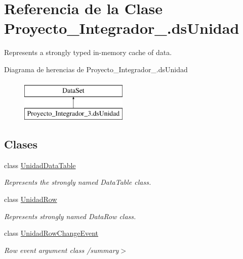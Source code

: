 \hypertarget{class_proyecto___integrador__3_1_1ds_unidad}{\section{Referencia de la Clase Proyecto\-\_\-\-Integrador\-\_.\-ds\-Unidad}
\label{class_proyecto___integrador__3_1_1ds_unidad}
}


Represents a strongly typed in-\/memory cache of data.  


Diagrama de herencias de Proyecto\-\_\-\-Integrador\-\_.\-ds\-Unidad\begin{figure}[H]
\begin{center}
\leavevmode
\includegraphics[height=2.000000cm]{class_proyecto___integrador__3_1_1ds_unidad}
\end{center}
\end{figure}
\subsection*{Clases}
\begin{DoxyCompactItemize}
\item 
class \hyperlink{class_proyecto___integrador__3_1_1ds_unidad_1_1_unidad_data_table}{Unidad\-Data\-Table}
\begin{DoxyCompactList}\small\item\em Represents the strongly named Data\-Table class. \end{DoxyCompactList}\item 
class \hyperlink{class_proyecto___integrador__3_1_1ds_unidad_1_1_unidad_row}{Unidad\-Row}
\begin{DoxyCompactList}\small\item\em Represents strongly named Data\-Row class. \end{DoxyCompactList}\item 
class \hyperlink{class_proyecto___integrador__3_1_1ds_unidad_1_1_unidad_row_change_event}{Unidad\-Row\-Change\-Event}
\begin{DoxyCompactList}\small\item\em Row event argument class /summary$>$ \end{DoxyCompactList}\end{DoxyCompactItemize}
